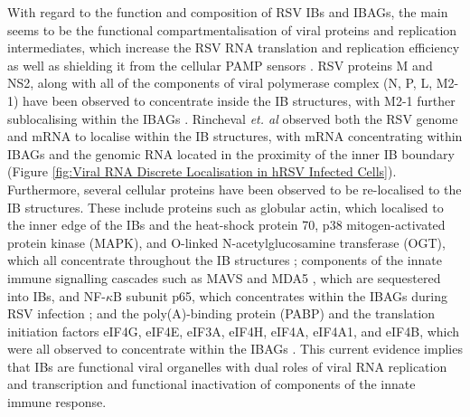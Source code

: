 With regard to the function and composition of RSV IBs and IBAGs, the main seems to be the functional compartmentalisation of viral proteins and replication intermediates, which increase the RSV RNA translation and replication efficiency as well as shielding it from the cellular PAMP sensors \cite{McDonald2004EvidenceAnalysis, Rincheval2017FunctionalVirus, Jobe2020RespiratorySignaling}. RSV proteins M and NS2, along with all of the components of viral polymerase complex (N, P, L, M2-1) have been observed to concentrate inside the IB structures, with M2-1 further sublocalising within the IBAGs \cite{Weber1995NonstructuralSerum, Fricke2013P38Assembly, Rincheval2017FunctionalVirus, Jobe2021BovineResponses}. Rincheval \textit{et. al} observed both the RSV genome and mRNA to localise within the IB structures, with mRNA concentrating within IBAGs and the genomic RNA located in the proximity of the inner IB boundary \cite{Rincheval2017FunctionalVirus} (Figure \ref{fig:Viral RNA Discrete Localisation in hRSV Infected Cells}). Furthermore, several cellular proteins have been observed to be re-localised to the IB structures. These include proteins such as globular actin, which localised to the inner edge of the IBs \cite{Brown2005EvidenceInfection} and the heat-shock protein 70, p38 mitogen-activated protein kinase (MAPK), and O-linked N-acetylglucosamine transferase (OGT), which all concentrate throughout the IB structures \cite{Brown2005EvidenceInfection, Fricke2013P38Assembly}; components of the innate immune signalling cascades such as MAVS and MDA5 \cite{Lifland2012HumanMAVS}, which are sequestered into IBs, and NF-\(\kappa\)B subunit p65, which concentrates within the IBAGs during RSV infection \cite{Jobe2020RespiratorySignaling}; and the poly(A)-binding protein (PABP) and the translation initiation factors eIF4G, eIF4E, eIF3A, eIF4H, eIF4A, eIF4A1, and eIF4B, which were all observed to concentrate within the IBAGs \cite{Rincheval2017FunctionalVirus, Jobe2023ViralCondensates}. This current evidence implies that IBs are functional viral organelles with dual roles of viral RNA replication and transcription and functional inactivation of components of the innate immune response.

